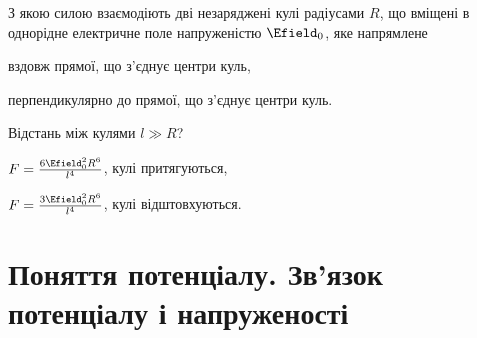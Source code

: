 \begin{problem}
З якою силою взаємодіють дві незаряджені кулі радіусами $R$, що вміщені в однорідне електричне поле напруженістю $\Efield_0$, яке напрямлене
\begin{enumerate*}[label=\alph*)]
	\item вздовж прямої, що з'єднує центри куль,
	\item перпендикулярно до прямої, що з'єднує центри куль.
\end{enumerate*}
Відстань між кулями $l \gg R$?
\begin{solution}
	\begin{enumerate*}[label=\alph*)]
		\item $F = \frac{6\Efield_0^2R^6}{l^4}$, кулі притягуються,
		\item $F = \frac{3\Efield_0^2R^6}{l^4}$, кулі відштовхуються.
	\end{enumerate*}
\end{solution}
\end{problem}

\section{Поняття потенціалу. Зв'язок потенціалу і напруженості}

